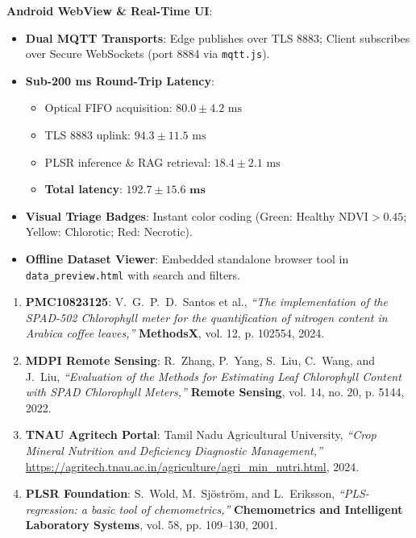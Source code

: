 \documentclass[11pt,a4paper,landscape]{article}
\begin{document}
\begin{minipage}[t]{0.48\textwidth}
\begin{tcolorbox}[colback=white,colframe=accent,title=\textbf{Mobile Client Dashboard (\texttt{index.html})},arc=2mm]
\textbf{Android WebView \& Real-Time UI}:
\begin{itemize}[leftmargin=*]
    \item \textbf{Dual MQTT Transports}: Edge publishes over TLS 8883; Client subscribes over Secure WebSockets (port 8884 via \texttt{mqtt.js}).
    \item \textbf{Sub-200 ms Round-Trip Latency}:
    \begin{itemize}[leftmargin=*]
        \item Optical FIFO acquisition: $80.0 \pm 4.2\text{ ms}$
        \item TLS 8883 uplink: $94.3 \pm 11.5\text{ ms}$
        \item PLSR inference \& RAG retrieval: $18.4 \pm 2.1\text{ ms}$
        \item \textbf{Total latency}: $\mathbf{192.7 \pm 15.6\text{ ms}}$
    \end{itemize}
    \item \textbf{Visual Triage Badges}: Instant color coding (Green: Healthy $\text{NDVI} > 0.45$; Yellow: Chlorotic; Red: Necrotic).
    \item \textbf{Offline Dataset Viewer}: Embedded standalone browser tool in \texttt{data\_preview.html} with search and filters.
\end{itemize}
\end{tcolorbox}
\end{minipage}

\vspace{0.4cm}
\begin{tcolorbox}[colback=lightgray,colframe=gray!60,title=\textbf{Scientific Citations \& Verification References},arc=2mm]
\footnotesize
\begin{enumerate}[leftmargin=*]
    \item \textbf{PMC10823125}: V.~G.~P.~D.~Santos et al., \textit{``The implementation of the SPAD-502 Chlorophyll meter for the quantification of nitrogen content in Arabica coffee leaves,''} \textbf{MethodsX}, vol. 12, p. 102554, 2024.
    \item \textbf{MDPI Remote Sensing}: R.~Zhang, P.~Yang, S.~Liu, C.~Wang, and J.~Liu, \textit{``Evaluation of the Methods for Estimating Leaf Chlorophyll Content with SPAD Chlorophyll Meters,''} \textbf{Remote Sensing}, vol. 14, no. 20, p. 5144, 2022.
    \item \textbf{TNAU Agritech Portal}: Tamil Nadu Agricultural University, \textit{``Crop Mineral Nutrition and Deficiency Diagnostic Management,''} \url{https://agritech.tnau.ac.in/agriculture/agri_min_nutri.html}, 2024.
    \item \textbf{PLSR Foundation}: S.~Wold, M.~Sj{\"o}str{\"o}m, and L.~Eriksson, \textit{``PLS-regression: a basic tool of chemometrics,''} \textbf{Chemometrics and Intelligent Laboratory Systems}, vol. 58, pp. 109--130, 2001.
\end{enumerate}
\end{tcolorbox}
\end{document}
